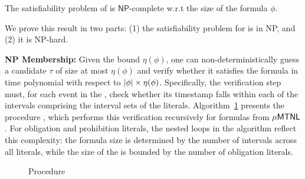 \begin{theorem}\label{is NP-complete}
    The satisfiability problem of \TDDLfm is $\mathsf{NP}$-complete w.r.t the size of the formula $\phi$.\label{lem:sat}
\end{theorem}
\begin{proofsketch}
    We prove this result in two parts: (1) the satisfiability problem for \TDDLfm is in NP, and (2) it is NP-hard.

   
    \textbf{NP Membership:} Given the bound $\eta(\phi)$, one can non-deterministically guess a candidate \timedword $\tau$ of size at most $\eta(\phi)$ and verify whether it satisfies the formula in time polynomial with respect to $\vert \phi\vert \times \eta(\phi)$. Specifically, the verification step must, for each event in the \timedword, check whether its timestamp falls within each of the intervals comprising the interval sets of the literals. Algorithm~\ref{fig:sat-procedure} presents the procedure \checksat, which performs this verification recursively for formulas from $\mathsf{\mu MTNL}$. For obligation and prohibition literals, the nested loops in the algorithm reflect this complexity: the formula size is determined by the number of intervals across all literals, while the size of the \timedword is bounded by the number of obligation literals.
\begin{figure}[h]
\begin{minipage}{0.9\textwidth}
\begin{algorithm}[H]
\caption{Procedure \checksat }
\label{fig:sat-procedure}
\end{algorithm}
\end{minipage}
\end{figure}
\end{proofsketch}
